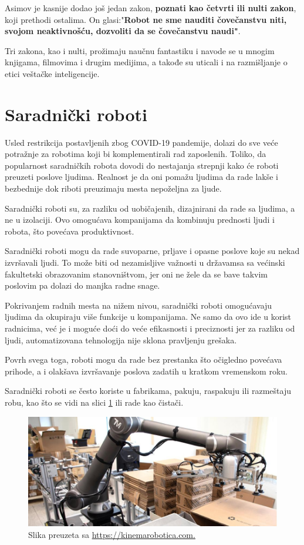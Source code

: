 \documentclass{article}
\begin{document}
	Asimov je kasnije dodao još jedan zakon, \textbf{poznati kao četvrti ili nulti zakon}, koji prethodi ostalima. On glasi:"\textbf{Robot ne sme nauditi čovečanstvu niti, svojom neaktivnošću, dozvoliti da se čovečanstvu naudi"}.\par
	Tri zakona, kao i nulti, prožimaju naučnu fantastiku i navode se u mnogim knjigama, filmovima i drugim medijima, a takođe su uticali i na razmišljanje o etici veštačke inteligencije. \cite{three laws of robotics}
	
	
	\section{Saradnički roboti}
	
	Usled restrikcija postavljenih zbog COVID-19 pandemije, dolazi do sve veće potražnje za robotima koji bi komplementirali rad zaposlenih. Toliko, da popularnost saradničkih robota dovodi do nestajanja strepnji kako će roboti preuzeti poslove ljudima. Realnost je da oni pomažu ljudima da rade lakše i bezbednije dok riboti preuzimaju mesta nepoželjna za ljude.
	
	Saradnički roboti su, za razliku od uobičajenih, dizajnirani da rade sa ljudima, a ne u izolaciji. Ovo omogućava kompanijama da kombinuju prednosti ljudi i robota, što povećava produktivnost. \cite{robotics2022}
	
	Saradnički roboti mogu da rade suvoparne, prljave i opasne poslove koje su nekad izvršavali ljudi. To može biti od nezamisljive važnosti u državamsa sa većinski fakultetski obrazovanim stanovništvom, jer oni ne žele da se bave takvim poslovim pa dolazi do manjka radne snage.
	
	Pokrivanjem radnih mesta na nižem nivou, saradnički roboti omogućavaju ljudima da okupiraju više funkcije u kompanijama. Ne samo da ovo ide u korist radnicima, već je i moguće doći do veće efikasnosti i preciznosti jer za razliku od ljudi, automatizovana tehnologija nije sklona pravljenju grešaka.
	
	Povrh svega toga, roboti mogu da rade bez prestanka što očigledno povećava prihode, a i olakšava izvršavanje poslova zadatih u kratkom vremenskom roku. \cite{cobots}
	
	Saradnički roboti se često koriste u fabrikama, pakuju, raspakuju ili razmeštaju robu, kao što se vidi na slici \ref{cobot} ili rade kao čistači. \cite{robots2022}
	
	\begin{figure}
		\centering
		\includegraphics[scale=0.41]{Cobot.jpg}
		\caption{Slika preuzeta sa \url{https://kinemarobotica.com.}}
		\label{cobot}
	\end{figure}
	
\end{document}
